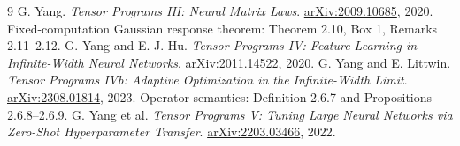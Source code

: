 \begin{thebibliography}{9}
 G. Yang. \emph{Tensor Programs III: Neural Matrix Laws}.
\href{https://arxiv.org/abs/2009.10685}{arXiv:2009.10685}, 2020.
Fixed-computation Gaussian response theorem: Theorem 2.10, Box 1,
Remarks 2.11--2.12.
 G. Yang and E. J. Hu. \emph{Tensor Programs IV: Feature Learning in Infinite-Width Neural Networks}.
\href{https://arxiv.org/abs/2011.14522}{arXiv:2011.14522}, 2020.
 G. Yang and E. Littwin. \emph{Tensor Programs IVb: Adaptive Optimization in the Infinite-Width Limit}.
\href{https://arxiv.org/abs/2308.01814}{arXiv:2308.01814}, 2023.
Operator semantics: Definition 2.6.7 and Propositions 2.6.8--2.6.9.
 G. Yang et al. \emph{Tensor Programs V: Tuning Large Neural Networks via Zero-Shot Hyperparameter Transfer}.
\href{https://arxiv.org/abs/2203.03466}{arXiv:2203.03466}, 2022.
\end{thebibliography}

